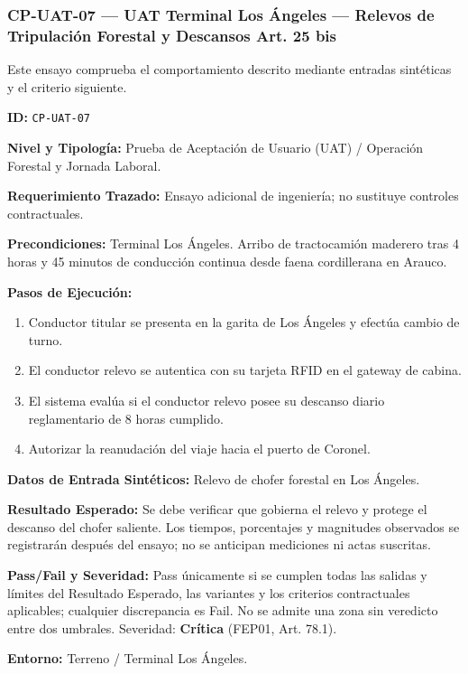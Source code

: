 \subsubsection*{CP-UAT-07 — UAT Terminal Los Ángeles — Relevos de Tripulación Forestal y Descansos Art. 25 bis}\label{sec:9-cp-uat-07}
Este ensayo comprueba el comportamiento descrito mediante entradas sintéticas y el criterio siguiente.

\par\noindent\textbf{ID:} \texttt{C\allowbreak{}P\allowbreak{}-\allowbreak{}U\allowbreak{}A\allowbreak{}T\allowbreak{}-\allowbreak{}0\allowbreak{}7\allowbreak{}}\par
\par\noindent\textbf{Nivel y Tipología:} Prueba de Aceptación de Usuario (UAT) / Operación Forestal y Jornada Laboral.\par
\par\noindent\textbf{Requerimiento Trazado:} Ensayo adicional de ingeniería; no sustituye controles contractuales.\par
\par\noindent\textbf{Precondiciones:} Terminal Los Ángeles. Arribo de tractocamión maderero tras 4 horas y 45 minutos de conducción continua desde faena cordillerana en Arauco.\par
\par\noindent\textbf{Pasos de Ejecución:} \par
\begin{enumerate}
\item Conductor titular se presenta en la garita de Los Ángeles y efectúa cambio de turno.
\item El conductor relevo se autentica con su tarjeta RFID en el gateway de cabina.
\item El sistema evalúa si el conductor relevo posee su descanso diario reglamentario de 8 horas cumplido.
\item Autorizar la reanudación del viaje hacia el puerto de Coronel.
\end{enumerate}
\par\noindent\textbf{Datos de Entrada Sintéticos:} Relevo de chofer forestal en Los Ángeles.\par
\par\noindent\textbf{Resultado Esperado:} Se debe verificar que gobierna el relevo y protege el descanso del chofer saliente. Los tiempos, porcentajes y magnitudes observados se registrarán después del ensayo; no se anticipan mediciones ni actas suscritas.\par
\par\noindent\textbf{Pass/Fail y Severidad:} Pass únicamente si se cumplen todas las salidas y límites del Resultado Esperado, las variantes y los criterios contractuales aplicables; cualquier discrepancia es Fail. No se admite una zona sin veredicto entre dos umbrales. Severidad: \textbf{Crítica} (FEP01, Art. 78.1).\par
\par\noindent\textbf{Entorno:} Terreno / Terminal Los Ángeles.\par






